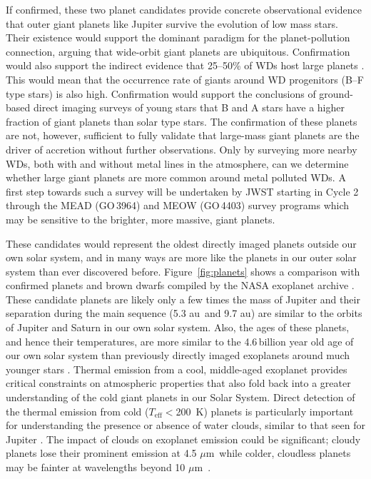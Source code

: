 \documentclass[twocolumn]{aastex631}
\newcommand{\au}{\,au}
\newcommand{\um}{\,$\mu$m}
\newcommand{\teff}{${T}_{\mathrm{eff}}$}
\begin{document}
If confirmed, these two planet candidates provide concrete observational evidence that outer giant planets like Jupiter survive the evolution of low mass stars. Their existence would support the dominant paradigm for the planet-pollution connection, arguing that wide-orbit giant planets are ubiquitous. Confirmation would also support the indirect evidence that 25--50\% of WDs host large planets \citep[as infered from the fraction of metal-polluted WDs,][]{Koester2014}.  This would mean that the occurrence rate of giants around WD progenitors (B--F type stars) is also high. Confirmation would support the conclusions of ground-based direct imaging surveys of young stars \citep{Nielsen2019GPI, Vigan2021} that B and A stars have a higher fraction of giant planets than solar type stars. The confirmation of these planets are not, however, sufficient to fully validate that large-mass giant planets are the driver of accretion without further observations. Only by surveying more nearby WDs, both with and without metal lines in the atmosphere, can we determine whether large giant planets are more common around metal polluted WDs. A first step towards such a survey will be undertaken by JWST starting in Cycle 2 through the MEAD (GO\,3964) and MEOW (GO\,4403) survey programs which may be sensitive to the brighter, more massive, giant planets.

These candidates would represent the oldest directly imaged planets outside our own solar system, and in many ways are more like the planets in our outer solar system than ever discovered before. Figure~\ref{fig:planets} shows a comparison with confirmed planets and brown dwarfs compiled by the NASA exoplanet archive .  These candidate planets are likely only a few times the mass of Jupiter and their separation during the main sequence (5.3\,\au\ and 9.7\,\au) are similar to the orbits of Jupiter and Saturn in our own solar system.  Also, the ages of these planets, and hence their temperatures, are more similar to the 4.6\,billion year old age of our own solar system than previously directly imaged exoplanets around much younger stars \citet[e.g.][]{Nielsen2019GPI}. Thermal emission from a cool, middle-aged exoplanet provides critical constraints on atmospheric properties that also fold back into a greater understanding of the cold giant planets in our Solar System. Direct detection of the thermal emission from cold (\teff$<$200~K) planets is particularly important for understanding the presence or absence of water clouds, similar to that seen for Jupiter \citep{Marley2021, Morley2014}.  The impact of clouds on exoplanet emission could be significant; cloudy planets lose their prominent emission at 4.5\,\um\ while colder, cloudless planets may be fainter at wavelengths beyond 10\,\um\ \citep{Limbach2022}. 
\end{document}
